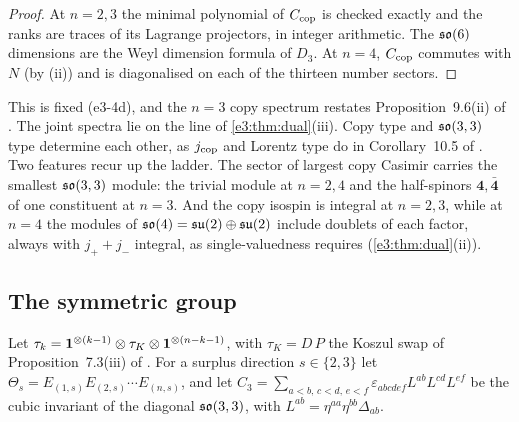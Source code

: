 \begin{proof}
At $n=2,3$ the minimal polynomial of $C_{\rm cop}$ is checked exactly and the ranks are traces of its Lagrange projectors, in integer
arithmetic. The $\mathfrak{so}(6)$ dimensions are the Weyl dimension formula of $D_3$. At $n=4$, $C_{\rm cop}$ commutes with $N$ (by (ii)) and is
diagonalised on each of the thirteen number sectors.
\end{proof}

This is fixed (e3-4d), and the $n=3$ copy spectrum restates Proposition~9.6(ii) of \cite{RE}. The joint spectra lie on the line of
\cref{e3:thm:dual}(iii). Copy type and $\mathfrak{so}(3,3)$ type determine each other, as $j_{\rm cop}$ and Lorentz type do in Corollary~10.5 of
\cite{ES17}. Two features recur up the ladder. The sector of largest copy Casimir carries the smallest $\mathfrak{so}(3,3)$ module: the trivial module at
$n=2,4$ and the half-spinors $\mathbf4,\bar{\mathbf4}$ of one constituent at $n=3$. And the copy isospin is integral at $n=2,3$, while at $n=4$ the
modules of $\mathfrak{so}(4)=\mathfrak{su}(2)\oplus\mathfrak{su}(2)$ include doublets of each factor, always with $j_++j_-$ integral, as single-valuedness requires (\cref{e3:thm:dual}(ii)).

\subsection{The symmetric group}
\label{e3:sec:sym}

Let $\tau_k=\mathbf 1^{\otimes(k-1)}\otimes\tau_K\otimes\mathbf 1^{\otimes(n-k-1)}$, with $\tau_K=D\,P$ the Koszul swap of Proposition~7.3(iii) of \cite{RE}. For a
surplus direction $s\in\{2,3\}$ let $\Theta_s=E_{(1,s)}E_{(2,s)}\cdots E_{(n,s)}$, and let $C_3=\sum_{a<b,\,c<d,\,e<f}\varepsilon_{abcdef}L^{ab}L^{cd}L^{ef}$ be the cubic invariant of
the diagonal $\mathfrak{so}(3,3)$, with $L^{ab}=\eta^{aa}\eta^{bb}\Delta_{ab}$.

